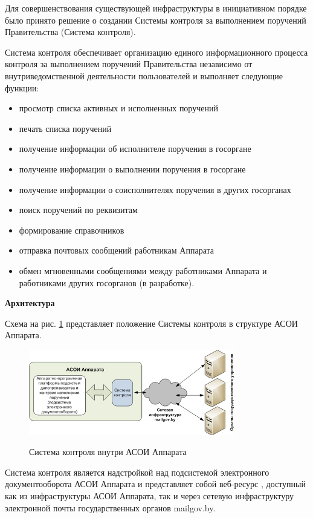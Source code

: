 \documentclass[10pt, a5paper]{article}
\begin{document}
Для совершенствования существующей инфраструктуры в инициативном порядке было принято решение о создании Системы контроля за выполнением поручений Правительства (Система контроля).

Система контроля обеспечивает организацию единого информационного процесса  контроля за выполнением поручений Правительства независимо от внутриведомственной деятельности пользователей и  выполняет следующие функции:

\begin{itemize}
  \item просмотр списка активных и исполненных поручений
  \item печать списка поручений
  \item получение информации об исполнителе поручения в госоргане
  \item получение информации о выполнении поручения в госоргане
  \item получение информации о соисполнителях поручения в других госорганах
  \item поиск поручений по реквизитам
  \item формирование справочников
  \item отправка почтовых сообщений работникам Аппарата
  \item обмен мгновенными сообщениями между работниками Аппарата и работниками других госорганов (в разработке).
\end{itemize}

\textbf{Архитектура}

Схема на рис. \ref{R1} представляет положение Системы контроля в структуре АСОИ Аппарата.

\begin{figure}[htpb]
  \centering
  \includegraphics[width=9cm]{110_2012_w_cmcntrlsys_figure1_1.jpg}
\label{R1}
\caption{Система контроля внутри АСОИ Аппарата}
\end{figure}

Система контроля является надстройкой над подсистемой электронного документооборота АСОИ Аппарата и представляет собой веб-ресурс , доступный как из инфраструктуры АСОИ Аппарата, так и через сетевую инфраструктуру электронной почты государственных органов mailgov.by.
\end{document}
